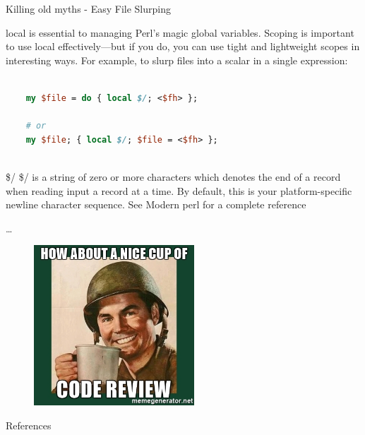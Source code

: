 \documentclass[10pt]{beamer}
\begin{document}
\begin{frame}[fragile]{Killing old myths - Easy File Slurping}

local is essential to managing Perl's magic global variables. Scoping is important to use local effectively—but if you do, you can use tight and lightweight scopes in interesting ways. For example, to slurp files into a scalar in a single expression:
\begin{lstlisting}[language=perl]

    my $file = do { local $/; <$fh> };

    # or
    my $file; { local $/; $file = <$fh> };
    
    \end{lstlisting}

    \begin{alertblock}{\$/}
    \$/ is a string of zero or more characters which denotes the end of a record when reading input a record at a time. By default, this is your platform-specific newline character sequence. See Modern perl for a complete reference
    \end{alertblock}

\end{frame}


\begin{frame}[fragile]{\ldots}

\begin{figure}
    \centering
    \includegraphics[width=6cm]{images/code_review.jpg}
\end{figure}

\end{frame}


\begin{frame}[allowframebreaks]{References}

  
  
\end{frame}



\end{document}
